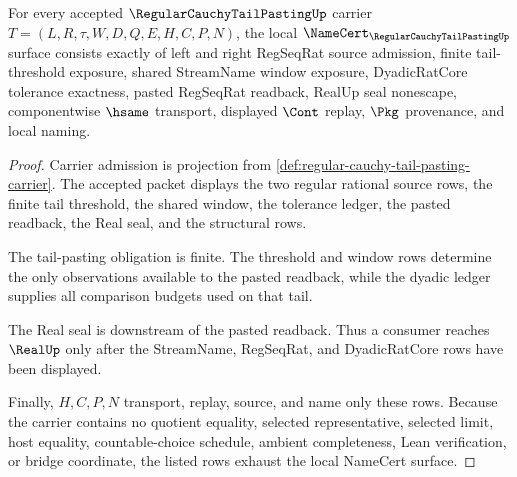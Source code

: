 \begin{theorem}
\label{thm:regular-cauchy-tail-pasting-namecert-obligations}
For every accepted $\RegularCauchyTailPastingUp$ carrier $T=(L,R,\tau,W,D,Q,E,H,C,P,N)$, the local $\NameCert_{\RegularCauchyTailPastingUp}$ surface consists exactly of left and right RegSeqRat source admission, finite tail-threshold exposure, shared StreamName window exposure, DyadicRatCore tolerance exactness, pasted RegSeqRat readback, RealUp seal nonescape, componentwise $\hsame$ transport, displayed $\Cont$ replay, $\Pkg$ provenance, and local naming.
\end{theorem}
\begin{proof}
Carrier admission is projection from \autoref{def:regular-cauchy-tail-pasting-carrier}. The accepted packet displays the two regular rational source rows, the finite tail threshold, the shared window, the tolerance ledger, the pasted readback, the Real seal, and the structural rows.

The tail-pasting obligation is finite. The threshold and window rows determine the only observations available to the pasted readback, while the dyadic ledger supplies all comparison budgets used on that tail.

The Real seal is downstream of the pasted readback. Thus a consumer reaches $\RealUp$ only after the StreamName, RegSeqRat, and DyadicRatCore rows have been displayed.

Finally, $H,C,P,N$ transport, replay, source, and name only these rows. Because the carrier contains no quotient equality, selected representative, selected limit, host equality, countable-choice schedule, ambient completeness, Lean verification, or bridge coordinate, the listed rows exhaust the local NameCert surface.
\end{proof}



